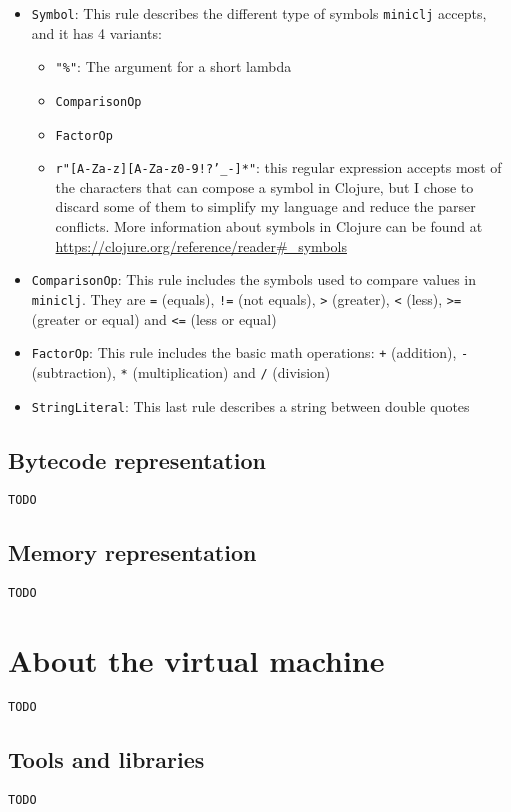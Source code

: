 \documentclass[11pt]{scrreprt}
\begin{document}
\begin{itemize}
  \item \texttt{Symbol}: This rule describes the different type of symbols \texttt{miniclj} accepts, and it has 4 variants:
  \begin{itemize}
    \item \texttt{"\%"}: The argument for a short lambda
    \item \texttt{ComparisonOp}
    \item \texttt{FactorOp}
    \item \texttt{r"[A-Za-z][A-Za-z0-9!?'\_-]*"}: this regular expression accepts most of the characters that can compose a symbol in Clojure, but I chose to discard some of them to simplify my language and reduce the parser conflicts. More information about symbols in Clojure can be found at \url{https://clojure.org/reference/reader#_symbols}
  \end{itemize}
  \item \texttt{ComparisonOp}: This rule includes the symbols used to compare values in \texttt{miniclj}. They are \texttt{=} (equals), \texttt{!=} (not equals), \texttt{>} (greater), \texttt{<} (less), \texttt{>=} (greater or equal) and \texttt{<=} (less or equal)
  \item \texttt{FactorOp}: This rule includes the basic math operations: \texttt{+} (addition), \texttt{-} (subtraction), \texttt{*} (multiplication) and \texttt{/} (division)
  \item \texttt{StringLiteral}: This last rule describes a string between double quotes
\end{itemize}

\section{Bytecode representation}
\texttt{TODO}

\section{Memory representation}
\texttt{TODO}


\chapter{About the virtual machine}
\texttt{TODO}

\section{Tools and libraries}
\texttt{TODO}
\end{document}
